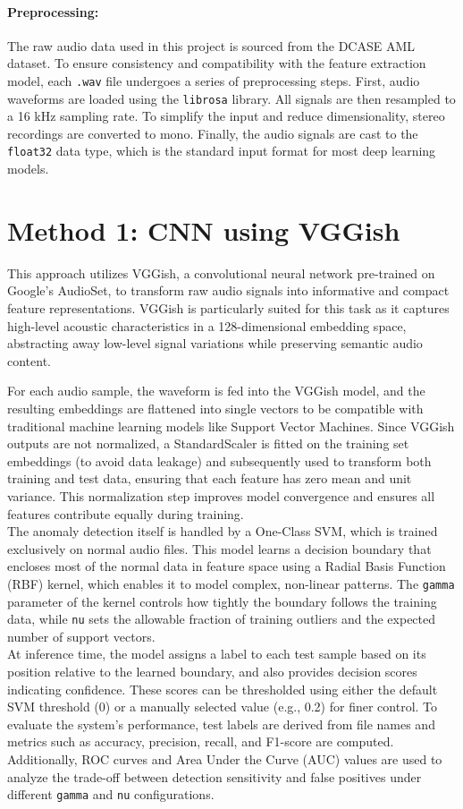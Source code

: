 \documentclass[ngerman]{scrartcl}
\begin{document}
\paragraph{Preprocessing:}
The raw audio data used in this project is sourced from the DCASE AML dataset. To ensure consistency and compatibility with the feature extraction model, each \texttt{.wav} file undergoes a series of preprocessing steps. First, audio waveforms are loaded using the \texttt{librosa} library. All signals are then resampled to a 16 kHz sampling rate. To simplify the input and reduce dimensionality, stereo recordings are converted to mono. Finally, the audio signals are cast to the \texttt{float32} data type, which is the standard input format for most deep learning models.

\section{Method 1: CNN using VGGish}
This approach utilizes VGGish, a convolutional neural network pre-trained on Google’s AudioSet, to transform raw audio signals into informative and compact feature representations. VGGish is particularly suited for this task as it captures high-level acoustic characteristics in a 128-dimensional embedding space, abstracting away low-level signal variations while preserving semantic audio content.

For each audio sample, the waveform is fed into the VGGish model, and the resulting embeddings are flattened into single vectors to be compatible with traditional machine learning models like Support Vector Machines. Since VGGish outputs are not normalized, a StandardScaler is fitted on the training set embeddings (to avoid data leakage) and subsequently used to transform both training and test data, ensuring that each feature has zero mean and unit variance. This normalization step improves model convergence and ensures all features contribute equally during training.\\
The anomaly detection itself is handled by a One-Class SVM, which is trained exclusively on normal audio files. This model learns a decision boundary that encloses most of the normal data in feature space using a Radial Basis Function (RBF) kernel, which enables it to model complex, non-linear patterns. The \texttt{gamma} parameter of the kernel controls how tightly the boundary follows the training data, while \texttt{nu} sets the allowable fraction of training outliers and the expected number of support vectors.\\
At inference time, the model assigns a label to each test sample based on its position relative to the learned boundary, and also provides decision scores indicating confidence. These scores can be thresholded using either the default SVM threshold (0) or a manually selected value (e.g., 0.2) for finer control. To evaluate the system’s performance, test labels are derived from file names and metrics such as accuracy, precision, recall, and F1-score are computed. Additionally, ROC curves and Area Under the Curve (AUC) values are used to analyze the trade-off between detection sensitivity and false positives under different \texttt{gamma} and \texttt{nu} configurations.
\end{document}
